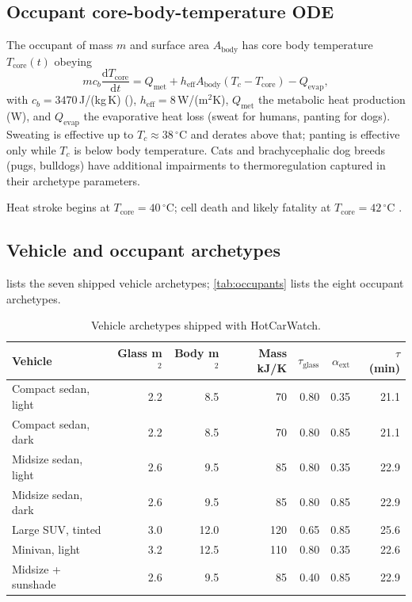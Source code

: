 \documentclass[10pt,twocolumn]{article}
\newcommand{\dd}{\mathrm{d}}
\begin{document}
\subsection{Occupant core-body-temperature ODE}

The occupant of mass $m$ and surface area $A_\text{body}$ has core
body temperature $T_\text{core}(t)$ obeying
\begin{equation}
m c_b \frac{\dd T_\text{core}}{\dd t}
  = Q_\text{met}
  + h_\text{eff} A_\text{body} (T_c - T_\text{core})
  - Q_\text{evap},
\label{eq:body}
\end{equation}
with $c_b = 3470$\,J/(kg\,K) (\citealp{burton1935specific}),
$h_\text{eff} = 8$\,W/(m$^2$K), $Q_\text{met}$ the metabolic heat
production (W), and $Q_\text{evap}$ the evaporative heat loss
(sweat for humans, panting for dogs).  Sweating is effective up to
$T_c \approx 38$\,$^\circ$C and derates above that; panting is
effective only while $T_c$ is below body temperature.  Cats and
brachycephalic dog breeds (pugs, bulldogs) have additional
impairments to thermoregulation captured in their archetype
parameters.

Heat stroke begins at $T_\text{core} = 40$\,$^\circ$C; cell death
and likely fatality at $T_\text{core} = 42$\,$^\circ$C
\citep{bouchama2002heatstroke}.

\subsection{Vehicle and occupant archetypes}

 lists the seven shipped vehicle archetypes;
\cref{tab:occupants} lists the eight occupant archetypes.

\begin{table}
\centering
\footnotesize
\begin{tabular}{lrrrrrr}
\toprule
Vehicle & Glass m$^2$ & Body m$^2$ & Mass kJ/K & $\tau_\text{glass}$ & $\alpha_\text{ext}$ & $\tau$ (min) \\
\midrule
Compact sedan, light  & 2.2 & 8.5 & 70 & 0.80 & 0.35 & 21.1 \\
Compact sedan, dark   & 2.2 & 8.5 & 70 & 0.80 & 0.85 & 21.1 \\
Midsize sedan, light  & 2.6 & 9.5 & 85 & 0.80 & 0.35 & 22.9 \\
Midsize sedan, dark   & 2.6 & 9.5 & 85 & 0.80 & 0.85 & 22.9 \\
Large SUV, tinted     & 3.0 & 12.0 & 120 & 0.65 & 0.85 & 25.6 \\
Minivan, light        & 3.2 & 12.5 & 110 & 0.80 & 0.35 & 22.6 \\
Midsize + sunshade    & 2.6 & 9.5 & 85 & 0.40 & 0.85 & 22.9 \\
\bottomrule
\end{tabular}
\caption{Vehicle archetypes shipped with HotCarWatch.}
\label{tab:vehicles}
\end{table}
\end{document}
